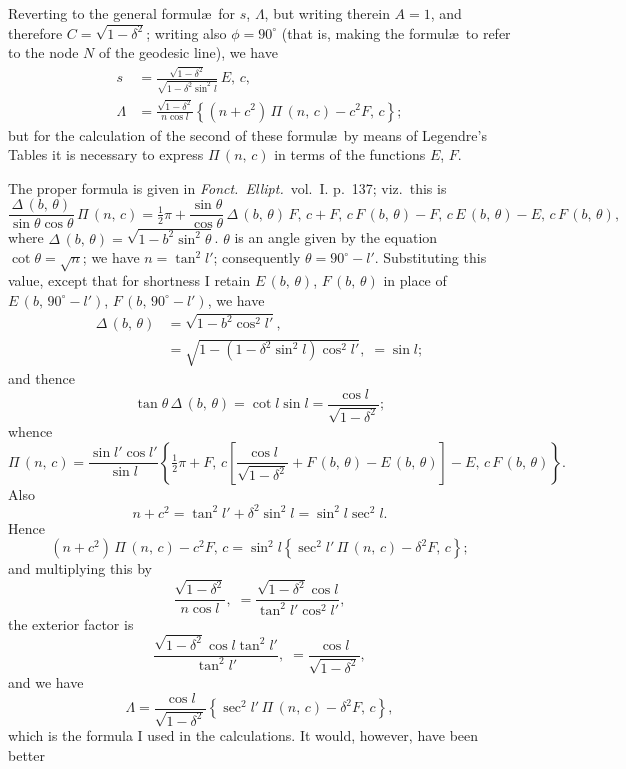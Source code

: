 \documentclass[11pt,a4paper]{article}
\theoremstyle{plain}
\theoremstyle{definition}
\begin{document}
Reverting to the general formul\ae\ for $s$, $\Lambda$, but writing therein $A=1$, and therefore
$C = \sqrt{1-\delta^2}$; writing also $\phi=90^\circ$ (that is, making the formul\ae\ to refer to the node
$N$ of the geodesic line), we have
\begin{align*}
s &= \frac{\sqrt{1-\delta^2}}{\sqrt{1-\delta^2\sin^2 l}}\,E,\,c, \\
\Lambda &= \frac{\sqrt{1-\delta^2}}{n\cos l}\left\{(n+c^2)\,\Pi\,(n,\,c) - c^2F,\,c\right\};
\end{align*}
but for the calculation of the second of these formul\ae\ by means of Legendre's Tables
it is necessary to express $\Pi\,(n,\,c)$ in terms of the functions $E$, $F$.

The proper formula is given in \textit{Fonct.\ Ellipt.}\ vol.~I. p.~137; viz.\ this is
\[
\frac{\Delta\,(b,\,\theta)}{\sin\theta\cos\theta}\,\Pi\,(n,\,c)
= \tfrac{1}{2}\pi + \frac{\sin\theta}{\cos\theta}\,\Delta\,(b,\,\theta)\,F,\,c
+ F,\,c\,F\,(b,\,\theta) - F,\,c\,E\,(b,\,\theta) - E,\,c\,F\,(b,\,\theta),
\]
where $\Delta\,(b,\,\theta) = \sqrt{1-b^2\sin^2\theta}$.  $\theta$ is an angle given by the equation $\cot\theta = \sqrt{n}$; we
have $n = \tan^2 l'$; consequently $\theta = 90^\circ - l'$.  Substituting this value, except that for
shortness I retain $E\,(b,\,\theta)$, $F\,(b,\,\theta)$ in place of $E\,(b,\,90^\circ-l')$, $F\,(b,\,90^\circ-l')$, we have
\begin{align*}
\Delta\,(b,\,\theta) &= \sqrt{1 - b^2\cos^2 l'}, \\
&= \sqrt{1 - (1-\delta^2\sin^2 l)\cos^2 l'}, \;= \sin l;
\end{align*}
and thence
\[
\tan\theta\,\Delta\,(b,\,\theta) = \cot l\sin l = \frac{\cos l}{\sqrt{1-\delta^2}};
\]
whence
\[
\Pi\,(n,\,c) = \frac{\sin l'\cos l'}{\sin l}
\left\{\tfrac{1}{2}\pi + F,\,c\left[\frac{\cos l}{\sqrt{1-\delta^2}}
+ F\,(b,\,\theta) - E\,(b,\,\theta)\right] - E,\,c\,F\,(b,\,\theta)\right\}.
\]
Also
\[
n + c^2 = \tan^2 l' + \delta^2\sin^2 l = \sin^2 l\sec^2 l.
\]
Hence
\[
(n+c^2)\,\Pi\,(n,\,c) - c^2F,\,c
= \sin^2 l\left\{\sec^2 l'\,\Pi\,(n,\,c) - \delta^2F,\,c\right\};
\]
and multiplying this by
\[
\frac{\sqrt{1-\delta^2}}{n\cos l}, \;= \frac{\sqrt{1-\delta^2}\cos l}{\tan^2 l'\cos^2 l'},
\]
the exterior factor is
\[
\frac{\sqrt{1-\delta^2}\cos l\tan^2 l'}{\tan^2 l'}, \;= \frac{\cos l}{\sqrt{1-\delta^2}},
\]
and we have
\[
\Lambda = \frac{\cos l}{\sqrt{1-\delta^2}}
\left\{\sec^2 l'\,\Pi\,(n,\,c) - \delta^2F,\,c\right\},
\]
which is the formula I used in the calculations.  It would, however, have been better
\end{document}
